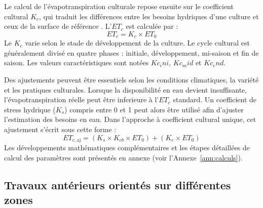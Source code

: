 Le calcul de l’évapotranspiration culturale repose ensuite sur le coefficient cultural $K_c$, qui traduit les différences entre les besoins hydriques d’une culture et ceux de la surface de référence \cite{allen_crop_1998-1}. L’$ET_c$ est calculée par : 
\begin{equation}
    ET_c = K_c \times ET_0
    \label{eq:etc}
\end{equation}
Le $K_c$ varie selon le stade de développement de la culture. Le cycle cultural est généralement divisé en quatre phases : initiale, développement, mi-saison et fin de saison. Les valeurs caractéristiques sont notées $Kc_ini$, $Kc_mid$ et $Kc_end$.

Des ajustements peuvent être essentiels selon les conditions climatiques, la variété et les pratiques culturales. Lorsque la disponibilité en eau devient insuffisante, 
l'évapotranspiration réelle peut être inferieure à l'$ET_c$ standard. Un coefficient de stress hydrique ($K_s$) compris entre 0 et 1 peut alors être utilisé afin d'ajuster l'estimation des besoins en eau. 
Dans l'approche à coefficient cultural unique, cet ajustement s'écrit sous cette forme : 
\begin{equation}
    ET_{c,\mathrm{aj}} = (K_s \times K_{cb} \times ET_0) + (K_e \times ET_0)
    \label{eq:etc_aj}
\end{equation}
Les développements mathématiques complémentaires et les étapes détaillées de calcul des paramètres sont présentés en annexe (voir l’Annexe~\ref{ann:calculs}).

\subsection{Travaux antérieurs orientés sur différentes zones}

